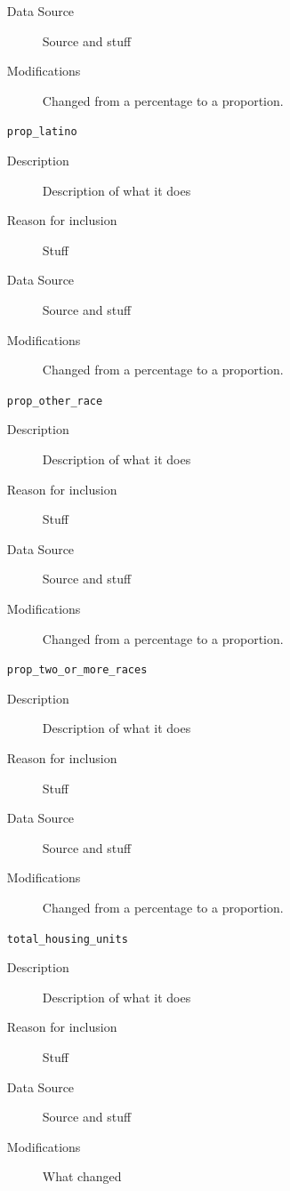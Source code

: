 \documentclass{article}
\begin{document}
\begin{itemize}[label={}, align=left]
\begin{description}
              \item[Data Source] Source and stuff
              \item[Modifications] Changed from a percentage to a proportion.
          \end{description}
    \item[\texttt{prop\_latino}] \
          \begin{description}
              \item[Description] Description of what it does
              \item[Reason for inclusion] Stuff
              \item[Data Source] Source and stuff
              \item[Modifications] Changed from a percentage to a proportion.
          \end{description}
    \item[\texttt{prop\_other\_race}] \
          \begin{description}
              \item[Description] Description of what it does
              \item[Reason for inclusion] Stuff
              \item[Data Source] Source and stuff
              \item[Modifications] Changed from a percentage to a proportion.
          \end{description}
    \item[\texttt{prop\_two\_or\_more\_races}] \
          \begin{description}
              \item[Description] Description of what it does
              \item[Reason for inclusion] Stuff
              \item[Data Source] Source and stuff
              \item[Modifications] Changed from a percentage to a proportion.
          \end{description}
    \item[\texttt{total\_housing\_units}] \
          \begin{description}
              \item[Description] Description of what it does
              \item[Reason for inclusion] Stuff
              \item[Data Source] Source and stuff
              \item[Modifications] What changed

\end{description}
\end{itemize}
\end{document}
